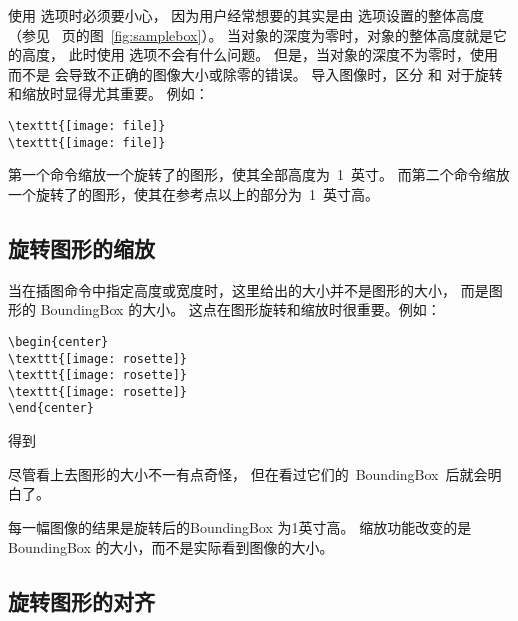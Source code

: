 使用  选项时必须要小心，
因为用户经常想要的其实是由  选项设置的整体高度
（参见~\pageref{fig:samplebox} 页的图~\ref{fig:samplebox}）。
当对象的深度为零时，对象的整体高度就是它的高度，
此时使用  选项不会有什么问题。
但是，当对象的深度不为零时，使用  而不是  会导致不正确的图像大小或除零的错误。
导入图像时，区分  和  对于旋转和缩放时显得尤其重要。
例如：
\begin{lstlisting}
\texttt{[image: file]}
\texttt{[image: file]}
\end{lstlisting}
第一个命令缩放一个旋转了的图形，使其全部高度为~1~英寸。
而第二个命令缩放一个旋转了的图形，使其在参考点以上的部分为~1~英寸高。

\subsection{旋转图形的缩放}\label{ssec:enlarge}
当在插图命令中指定高度或宽度时，这里给出的大小并不是图形的大小，
而是图形的 BoundingBox 的大小。
这点在图形旋转和缩放时很重要。例如：
\begin{lstlisting}
\begin{center}
\texttt{[image: rosette]}
\texttt{[image: rosette]}
\texttt{[image: rosette]}
\end{center}
\end{lstlisting}
得到

\begin{center}
	\resizebox*{!}{1in}{\usebox{\boxrosette}}
\end{center}
尽管看上去图形的大小不一有点奇怪，
但在看过它们的~BoundingBox~后就会明白了。

\begin{center}
	\resizebox*{!}{1in}{\usebox{\boxrosettebox}}
\end{center}
每一幅图像的结果是旋转后的BoundingBox 为1英寸高。
缩放功能改变的是BoundingBox 的大小，而不是实际看到图像的大小。


\subsection{旋转图形的对齐}\label{ssec:ralign}

